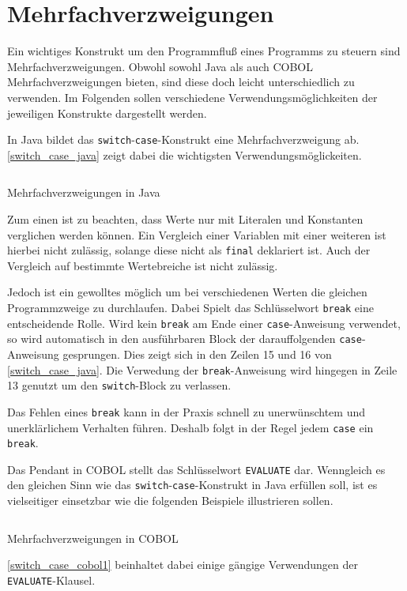 \section{Mehrfachverzweigungen}
Ein wichtiges Konstrukt um den Programmfluß eines Programms zu steuern sind Mehrfachverzweigungen. Obwohl sowohl Java als auch COBOL Mehrfachverzweigungen bieten, sind diese doch leicht unterschiedlich zu verwenden. Im Folgenden sollen verschiedene Verwendungsmöglichkeiten der jeweiligen Konstrukte dargestellt werden.

In Java bildet das \texttt{switch}-\texttt{case}-Konstrukt eine Mehrfachverzweigung ab. \autoref{switch_case_java} zeigt dabei die wichtigsten Verwendungsmöglickeiten.

\begin{listing}[H]
  \inputminted{java}{Code/switch_case.java}
  \caption{Mehrfachverzweigungen in Java}
  \label{switch_case_java}
\end{listing} 

Zum einen ist zu beachten, dass Werte nur mit Literalen und Konstanten verglichen werden können. Ein Vergleich einer Variablen mit einer weiteren ist hierbei nicht zulässig, solange diese nicht als \texttt{final} deklariert ist. Auch der Vergleich auf bestimmte Wertebreiche ist nicht zulässig. 

Jedoch ist ein gewolltes  möglich um bei verschiedenen Werten die gleichen Programmzweige zu durchlaufen. Dabei Spielt das Schlüsselwort \texttt{break} eine entscheidende Rolle. Wird kein \texttt{break} am Ende einer \texttt{case}-Anweisung verwendet, so wird automatisch in den ausführbaren Block der darauffolgenden \texttt{case}-Anweisung gesprungen. Dies zeigt sich in den Zeilen 15 und 16 von \autoref{switch_case_java}. Die Verwedung der \texttt{break}-Anweisung wird hingegen in Zeile 13 genutzt um den \texttt{switch}-Block zu verlassen. 

Das Fehlen eines \texttt{break} kann in der Praxis schnell zu unerwünschtem und unerklärlichem Verhalten führen. Deshalb folgt in der Regel jedem \texttt{case} ein \texttt{break}. 

Das Pendant in COBOL stellt das Schlüsselwort \texttt{EVALUATE} dar. Wenngleich es den gleichen Sinn wie das \texttt{switch}-\texttt{case}-Konstrukt in Java erfüllen soll, ist es vielseitiger einsetzbar wie die folgenden Beispiele illustrieren sollen.

\begin{listing}[H]
  \inputminted{cobol}{Code/switch_case.cbl}
  \caption{Mehrfachverzweigungen in COBOL}
  \label{switch_case_cobol1}
\end{listing} 

\autoref{switch_case_cobol1} beinhaltet dabei einige gängige Verwendungen der \texttt{EVALUATE}-Klausel.